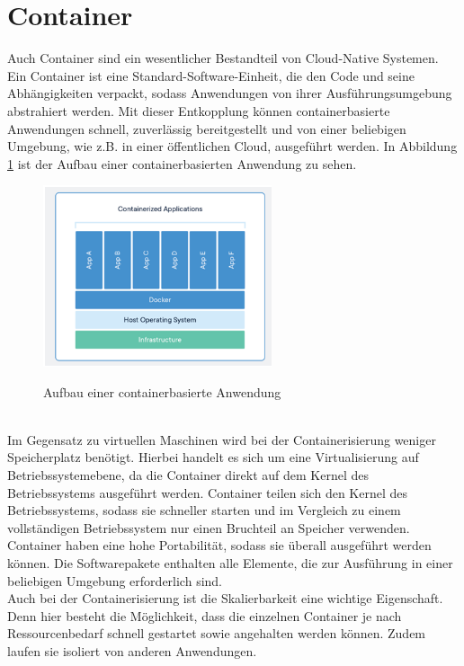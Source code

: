 \section{Container}
Auch Container sind ein wesentlicher Bestandteil von Cloud-Native Systemen.\\
Ein Container ist eine Standard-Software-Einheit, die den Code und seine Abhängigkeiten verpackt, sodass Anwendungen von ihrer Ausführungsumgebung abstrahiert werden. Mit dieser Entkopplung können containerbasierte Anwendungen schnell, zuverlässig bereitgestellt und von einer beliebigen Umgebung, wie z.B. in einer öffentlichen Cloud, ausgeführt werden. In Abbildung \ref{container} ist der Aufbau einer containerbasierten Anwendung zu sehen.\\
\begin{figure}[bth] 
	\centering
	\includegraphics[width=0.6\textwidth]{Graphics/Container.png}
	\caption{Aufbau einer containerbasierte Anwendung}
	\label{container}
	\cite{container}
\end{figure}\\
Im Gegensatz zu virtuellen Maschinen wird bei der Containerisierung weniger Speicherplatz benötigt. Hierbei handelt es sich um eine Virtualisierung auf Betriebssystemebene, da die Container direkt auf dem Kernel des Betriebssystems ausgeführt werden. Container teilen sich den Kernel des Betriebssystems, sodass sie schneller starten und im Vergleich zu einem vollständigen Betriebssystem nur einen Bruchteil an Speicher verwenden.\\
Container haben eine hohe Portabilität, sodass sie überall ausgeführt werden können. Die Softwarepakete enthalten alle Elemente, die zur Ausführung in einer beliebigen Umgebung erforderlich sind.\\
Auch bei der Containerisierung ist die Skalierbarkeit eine wichtige Eigenschaft. Denn hier besteht die Möglichkeit, dass die einzelnen Container je nach Ressourcenbedarf schnell gestartet sowie angehalten werden können. Zudem laufen sie isoliert von anderen Anwendungen.\cite{container}\\
